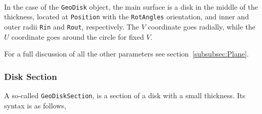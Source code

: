 ~\\
In the case of the {\tt GeoDisk} object, the main surface is a disk in the middle of the thickness, located at {\tt Position} with the 
{\tt RotAngles} orientation, and inner and outer radii {\tt Rin} and {\tt Rout}, respectively. The $V$ coordinate goes radially, while the 
$U$ coordinate goes around the circle for fixed $V$.

For a full discussion of all the other parameters see section~\ref{subsubsec:Plane}.

\subsubsection{Disk Section}

A so-called {\tt GeoDiskSection}, is a section of a disk with a small thickness. Its syntax is as follows,


